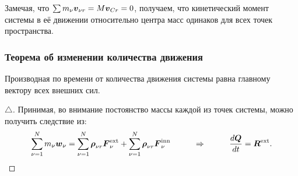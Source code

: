 Замечая, что $\sum m_\nu\mbox{\boldmath $v$}_{\nu r} = M \mbox{\boldmath $v$}_{C r} = 0$, получаем, что кинетический момент системы в её движении относительно центра масс одинаков для всех точек пространства.

\subsubsection*{Теорема об изменении количества движения}
\begin{to_thr}
	Производная по времени от количества движения системы равна главному вектору всех внешних сил.
\end{to_thr}
\begin{proof}[$\triangle$]
	Принимая, во внимание постоянство массы каждой из точек системы, можно получить следствие из:
	\begin{equation*}
		\sum_{\nu=1}^N m_\nu \mbox{\boldmath $w$}_\nu 
		=  \sum_{\nu=1}^N \mbox{\boldmath $\rho$}_{\nu r} \mbox{\boldmath $F$}_\nu^{\text{ext}} 
 		+ \sum_{\nu=1}^N \mbox{\boldmath $\rho$}_{\nu r} \mbox{\boldmath $F$}_\nu^{\text{inn}}
		\hspace*{1 cm}
		\Rightarrow
		\hspace*{1 cm}
		\frac{d \mbox{\boldmath $Q$}}{d t} = \mbox{\boldmath $R$}^{\text{ext}}.
	\end{equation*}
\end{proof}